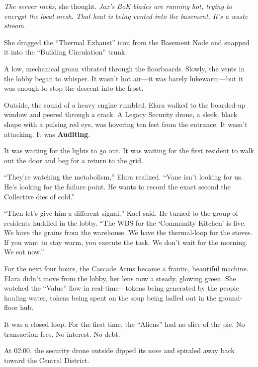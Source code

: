 \textit{The server racks,} she thought. \textit{Jax’s BoK blades are running hot, trying to encrypt the local mesh. That heat is being vented into the basement. It’s a waste stream.}

She dragged the ``Thermal Exhaust'' icon from the Basement Node and snapped it into the ``Building Circulation'' trunk. 


A low, mechanical groan vibrated through the floorboards. Slowly, the vents in the lobby began to whisper. It wasn't hot air—it was barely lukewarm—but it was enough to stop the descent into the frost. 

Outside, the sound of a heavy engine rumbled. Elara walked to the boarded-up window and peered through a crack. A Legacy Security drone, a sleek, black shape with a pulsing red eye, was hovering ten feet from the entrance. It wasn't attacking. It was \textbf{Auditing}.

It was waiting for the lights to go out. It was waiting for the first resident to walk out the door and beg for a return to the grid. 

``They’re watching the metabolism,'' Elara realized. ``Vane isn't looking for us. He’s looking for the failure point. He wants to record the exact second the Collective dies of cold.''



``Then let's give him a different signal,'' Kael said. He turned to the group of residents huddled in the lobby. ``The WBS for the `Community Kitchen' is live. We have the grains from the warehouse. We have the thermal-loop for the stoves. If you want to stay warm, you execute the task. We don't wait for the morning. We eat now.''

For the next four hours, the Cascade Arms became a frantic, beautiful machine. Elara didn't move from the lobby, her lens now a steady, glowing green. She watched the ``Value'' flow in real-time—tokens being generated by the people hauling water, tokens being spent on the soup being ladled out in the ground-floor hub. 

It was a closed loop. For the first time, the ``Aliens'' had no slice of the pie. No transaction fees. No interest. No debt. 

At 02:00, the security drone outside dipped its nose and spiraled away back toward the Central District. 

